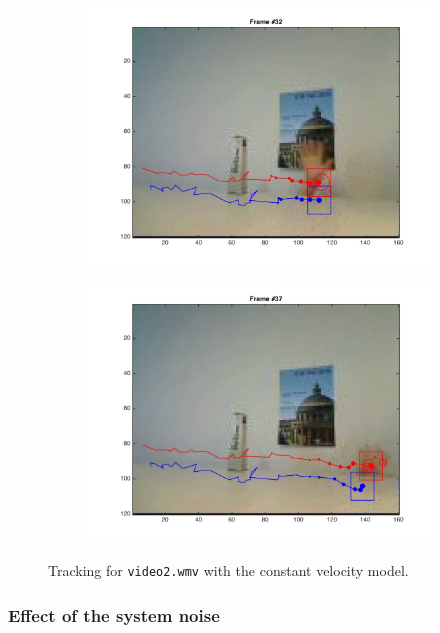 \documentclass{ethz_report}
\begin{document}
\begin{figure}[h]
\begin{subfigure}[b]{.25\textwidth}
        \includegraphics[width=1\linewidth]{images/video2_model_31}
    \end{subfigure}%
    \begin{subfigure}[b]{.25\textwidth}
        \centering
        \includegraphics[width=1\linewidth]{images/video2_model_36}
    \end{subfigure}
    \caption{Tracking for \texttt{video2.wmv} with the constant velocity model.}
    \label{fig:tracking_video2_model}
\end{figure}

\subsubsection*{Effect of the system noise}
\end{document}
